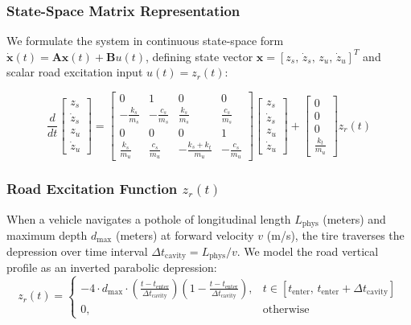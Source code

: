 \subsubsection{State-Space Matrix Representation}
We formulate the system in continuous state-space form $\dot{\mathbf{x}}(t) = \mathbf{A}\mathbf{x}(t) + \mathbf{B} u(t)$, defining state vector $\mathbf{x} = [z_s, \, \dot{z}_s, \, z_u, \, \dot{z}_u]^T$ and scalar road excitation input $u(t) = z_r(t)$:

\begin{equation}
    \frac{d}{dt}
    \begin{bmatrix}
        z_s \\
        \dot{z}_s \\
        z_u \\
        \dot{z}_u
    \end{bmatrix}
    =
    \begin{bmatrix}
        0 & 1 & 0 & 0 \\
        -\frac{k_s}{m_s} & -\frac{c_s}{m_s} & \frac{k_s}{m_s} & \frac{c_s}{m_s} \\
        0 & 0 & 0 & 1 \\
        \frac{k_s}{m_u} & \frac{c_s}{m_u} & -\frac{k_s + k_t}{m_u} & -\frac{c_s}{m_u}
    \end{bmatrix}
    \begin{bmatrix}
        z_s \\
        \dot{z}_s \\
        z_u \\
        \dot{z}_u
    \end{bmatrix}
    +
    \begin{bmatrix}
        0 \\
        0 \\
        0 \\
        \frac{k_t}{m_u}
    \end{bmatrix}
    z_r(t)
    \label{eq:state_space_quarter_car}
\end{equation}

\subsubsection{Road Excitation Function $z_r(t)$}
When a vehicle navigates a pothole of longitudinal length $L_{\text{phys}}$ (meters) and maximum depth $d_{\max}$ (meters) at forward velocity $v$ (m/s), the tire traverses the depression over time interval $\Delta t_{\text{cavity}} = L_{\text{phys}} / v$. We model the road vertical profile as an inverted parabolic depression:
\begin{equation}
    z_r(t) = 
    \begin{cases}
        -4 \cdot d_{\max} \cdot \left(\frac{t - t_{\text{enter}}}{\Delta t_{\text{cavity}}}\right) \left(1 - \frac{t - t_{\text{enter}}}{\Delta t_{\text{cavity}}}\right), & t \in [t_{\text{enter}}, \, t_{\text{enter}} + \Delta t_{\text{cavity}}] \\
        0, & \text{otherwise}
    \end{cases}
    \label{eq:road_profile_ode}
\end{equation}

